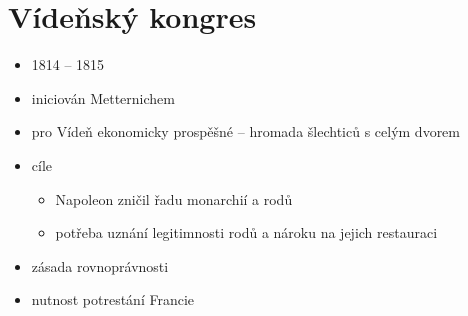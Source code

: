 \section{Vídeňský kongres}
\begin{itemize}
\item 1814 -- 1815
\item iniciován Metternichem
\item pro Vídeň ekonomicky prospěšné -- hromada šlechticů s celým dvorem
\item cíle
	\begin{itemize}
	\item Napoleon zničil řadu monarchií a rodů
	\item potřeba uznání legitimnosti rodů a nároku na jejich restauraci
	\end{itemize}
\item zásada rovnoprávnosti
\item nutnost potrestání Francie
\end{itemize}

